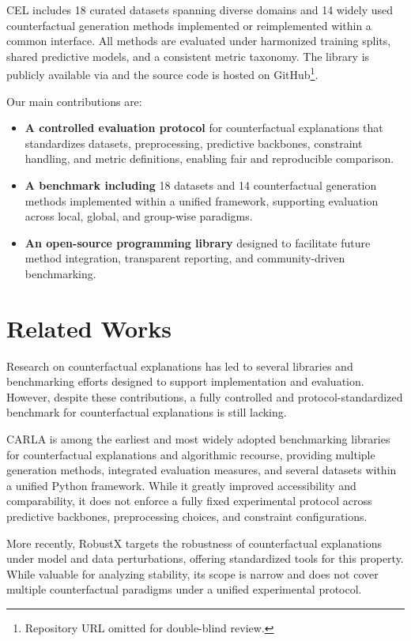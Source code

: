 \documentclass[runningheads]{llncs}
\newcommand{\code}[1]{\Colorbox{lightblue}{\lstinline{#1}}}
\begin{document}
CEL includes 18 curated datasets spanning diverse domains and 14 widely used counterfactual generation methods implemented or reimplemented within a common interface. All methods are evaluated under harmonized training splits, shared predictive models, and a consistent metric taxonomy. The library is publicly available via \code{pip install ce-library} and the source code is hosted on GitHub\footnote{Repository URL omitted for double-blind review.}.

\smallskip
\noindent
Our main contributions are:

\begin{itemize}
\item \textbf{A controlled evaluation protocol} for counterfactual explanations that standardizes datasets, preprocessing, predictive backbones, constraint handling, and metric definitions, enabling fair and reproducible comparison.
\item \textbf{A benchmark including} 18 datasets and 14 counterfactual generation methods implemented within a unified framework, supporting evaluation across local, global, and group-wise paradigms.
\item \textbf{An open-source programming library} designed to facilitate future method integration, transparent reporting, and community-driven benchmarking.
\end{itemize}


\section{Related Works}

Research on counterfactual explanations has led to several libraries and benchmarking efforts designed to support implementation and evaluation. However, despite these contributions, a fully controlled and protocol-standardized benchmark for counterfactual explanations is still lacking.

CARLA \cite{pawelczyk2021carla} is among the earliest and most widely adopted benchmarking libraries for counterfactual explanations and algorithmic recourse, providing multiple generation methods, integrated evaluation measures, and several datasets within a unified Python framework. While it greatly improved accessibility and comparability, it does not enforce a fully fixed experimental protocol across predictive backbones, preprocessing choices, and constraint configurations.

More recently, RobustX \cite{jiang2025robustx} targets the robustness of counterfactual explanations under model and data perturbations, offering standardized tools for this property. While valuable for analyzing stability, its scope is narrow and does not cover multiple counterfactual paradigms under a unified experimental protocol.
\end{document}
